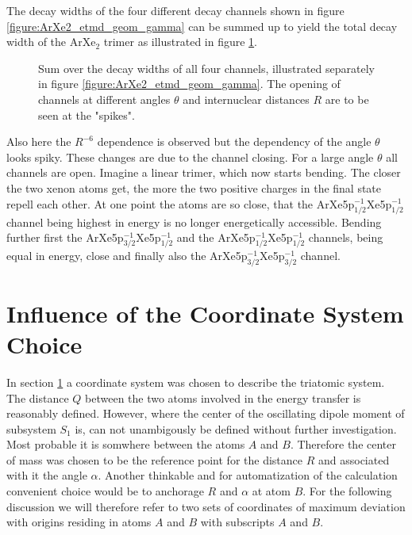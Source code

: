 The decay widths of the four different decay channels shown in
figure \ref{figure:ArXe2_etmd_geom_gamma} can be summed up to yield
the total decay width of the ArXe$_2$ trimer as illustrated in figure
\ref{figure:ArXe2_etmd_geom_gamma_total}.

\begin{figure}[h]
 \centering
 
 \caption{Sum over the decay widths of all four channels, illustrated
          separately in figure \ref{figure:ArXe2_etmd_geom_gamma}.
          The opening of channels at different angles $\theta$ and
          internuclear distances $R$ are to be seen at the "spikes".}
 \label{figure:ArXe2_etmd_geom_gamma_total}
\end{figure}

Also here the $R^{-6}$ dependence is observed but the dependency
of the angle $\theta$ looks spiky. These changes are due to the channel
closing. For a large angle $\theta$ all channels are open. Imagine a linear
trimer, which now starts bending. The closer
the two xenon atoms get, the more the two positive charges in the final
state repell each other. At one point the atoms are so close, that the
ArXe5p$_{1/2}^{-1}$Xe5p$_{1/2}^{-1}$ channel being highest in energy
is no longer energetically accessible. Bending further first the
ArXe5p$_{3/2}^{-1}$Xe5p$_{1/2}^{-1}$ and the
ArXe5p$_{1/2}^{-1}$Xe5p$_{1/2}^{-1}$ channels, being equal in energy,
close and finally also the ArXe5p$_{3/2}^{-1}$Xe5p$_{3/2}^{-1}$
channel.


\section{Influence of the Coordinate System Choice}
In section \ref{} a coordinate system was chosen to describe the
triatomic system. The distance $Q$ between the two atoms involved
in the energy transfer is reasonably defined. However, where the
center of the oscillating dipole moment of subsystem $S_1$ is, can
not unambigously be defined without further investigation. Most
probable it is somwhere between the atoms $A$ and $B$. Therefore
the center of mass was chosen to be the reference point for the
distance $R$ and associated with it the angle $\alpha$.
Another thinkable and for automatization of the calculation
convenient choice would be to anchorage $R$ and $\alpha$ at
atom $B$.
For the following discussion we will therefore refer to two sets
of coordinates of maximum deviation with origins residing in atoms
$A$ and $B$ with subscripts $A$ and $B$.

